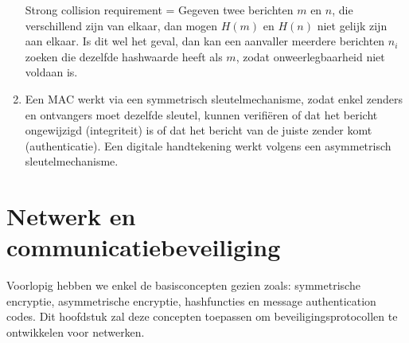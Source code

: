 \documentclass{report}
\begin{document}
\begin{enumerate}
		Strong collision requirement = Gegeven twee berichten $m$ en $n$, die verschillend zijn van elkaar, dan mogen $H(m)$ en $H(n)$ niet gelijk zijn aan elkaar. Is dit wel het geval, dan kan een aanvaller meerdere berichten $n_i$ zoeken die dezelfde hashwaarde heeft als $m$, zodat onweerlegbaarheid niet voldaan is. 
		\item {}

		Een MAC werkt via een symmetrisch sleutelmechanisme, zodat enkel zenders en ontvangers moet dezelfde sleutel, kunnen verifiëren of dat het bericht ongewijzigd (integriteit) is of dat het bericht van de juiste zender komt (authenticatie). Een digitale handtekening werkt volgens een asymmetrisch sleutelmechanisme.  
 	\end{enumerate}


	\chapter{Netwerk en communicatiebeveiliging}
	Voorlopig hebben we enkel de basisconcepten gezien zoals: symmetrische encryptie, asymmetrische encryptie, hashfuncties en message authentication codes. Dit hoofdstuk zal deze concepten toepassen om beveiligingsprotocollen te ontwikkelen voor netwerken.
\end{document}
